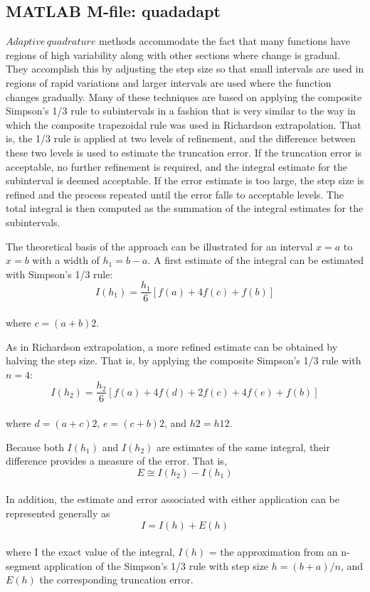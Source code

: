 \documentclass[../main.tex]{subfiles}
\begin{document}
\subsection{MATLAB M-file: \small{quadadapt}}
$Adaptive\,quadrature$ methods accommodate the fact that many functions have regions of
high variability along with other sections where change is gradual. They accomplish this
by adjusting the step size so that small intervals are used in regions of rapid variations
and larger intervals are used where the function changes gradually. Many of these techniques are based on applying the composite Simpson's 1/3 rule to subintervals in a fashion that is very similar to the way in which the composite trapezoidal rule was used in
Richardson extrapolation. That is, the 1/3 rule is applied at two levels of refinement, and
the difference between these two levels is used to estimate the truncation error. If the
truncation error is acceptable, no further refinement is required, and the integral estimate
for the subinterval is deemed acceptable. If the error estimate is too large, the step size is
refined and the process repeated until the error falls to acceptable levels. The total integral is then computed as the summation of the integral estimates for the subintervals.

The theoretical basis of the approach can be illustrated for an interval $x = a$ to $x = b$
with a width of $h_1 = b - a$. A first estimate of the integral can be estimated with Simpson's
1/3 rule:
\begin{equation}
	\tag{20.25}
	I(h_1)=\dfrac{h_{1}}{6}[f(a)+4f(c)+f(b)]
\end{equation}\\
where $c = (a + b)2$.

As in Richardson extrapolation, a more refined estimate can be obtained by halving
the step size. That is, by applying the composite Simpson's 1/3 rule with $n = 4$:
\begin{equation}
	\tag{20.26}
	I(h_2)=\dfrac{h_{2}}{6}[f(a)+4f(d)+2f(c)+4f(e)+f(b)]
\end{equation}\\
where $d = (a + c)2$, $e = (c + b)2$, and $h2 = h12$.

Because both $I(h_1)$ and $I(h_2)$ are estimates of the same integral, their difference provides a measure of the error. That is,
\begin{equation}
	\tag{20.27}
	E \cong I(h_2) - I(h_1)
\end{equation}\\
In addition, the estimate and error associated with either application can be represented
generally as
\begin{equation}
	\tag{20.28}
	I=I(h)+E(h)
\end{equation}\\
where I  the exact value of the integral, $I(h)$ =  the approximation from an n-segment
application of the Simpson's 1/3 rule with step size $h = (b + a)/n$, and $E(h)$  the corresponding truncation error.
\end{document}
